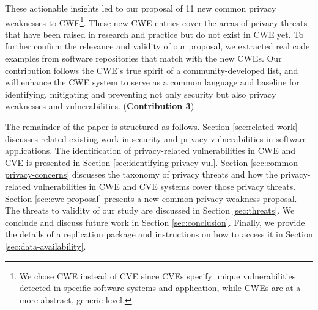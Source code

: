 These actionable insights led to our proposal of 11 new common privacy weaknesses to CWE\footnote{We chose CWE instead of CVE since CVEs specify unique vulnerabilities detected in specific software systems and application, while CWEs are at a more abstract, generic level.}. These new CWE entries cover the areas of privacy threats that have been raised in research and practice but do not exist in CWE yet. To further confirm the relevance and validity of our proposal, we extracted real code examples from software repositories that match with the new CWEs. Our contribution follows the CWE's true spirit of a community-developed list, and will enhance the CWE system to serve as a common language and baseline for identifying, mitigating and preventing not only security but also privacy weaknesses and vulnerabilities. (\textbf{\underline{Contribution 3}})

The remainder of the paper is structured as follows. Section \ref{sec:related-work} discusses related existing work in security and privacy vulnerabilities in software applications. The identification of privacy-related vulnerabilities in CWE and CVE is presented in Section \ref{sec:identifying-privacy-vul}. Section \ref{sec:common-privacy-concerns} discusses the taxonomy of privacy threats and how the privacy-related vulnerabilities in CWE and CVE systems cover those privacy threats. Section \ref{sec:cwe-proposal} presents a new common privacy weakness proposal. The threats to validity of our study are discussed in Section \ref{sec:threats}. We conclude and discuss future work in Section \ref{sec:conclusion}. Finally, we provide the details of a replication package and instructions on how to access it in Section \ref{sec:data-availability}.


